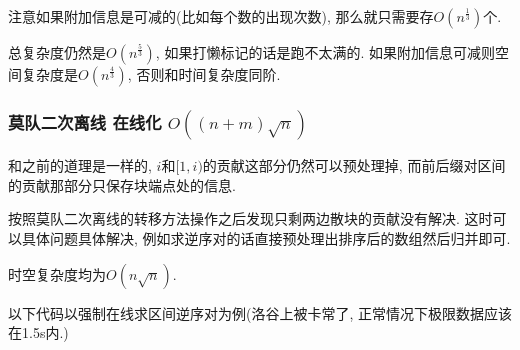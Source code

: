 注意如果附加信息是可减的(比如每个数的出现次数), 那么就只需要存$O(n^{\frac 1 3})$个.

总复杂度仍然是$O(n^{\frac 5 3})$, 如果打懒标记的话是跑不太满的. 如果附加信息可减则空间复杂度是$O(n^{\frac 4 3})$, 否则和时间复杂度同阶.

\subsubsection{莫队二次离线 在线化 $O((n + m)\sqrt n)$}

和之前的道理是一样的, $i$和$[1, i)$的贡献这部分仍然可以预处理掉, 而前后缀对区间的贡献那部分只保存块端点处的信息.

按照莫队二次离线的转移方法操作之后发现只剩两边散块的贡献没有解决. 这时可以具体问题具体解决, 例如求逆序对的话直接预处理出排序后的数组然后归并即可.

时空复杂度均为$O(n\sqrt n)$.

以下代码以强制在线求区间逆序对为例(洛谷上被卡常了, 正常情况下极限数据应该在1.5s内.)

\inputminted{cpp}{../src/datastructure/莫队二次离线在线化.cpp}